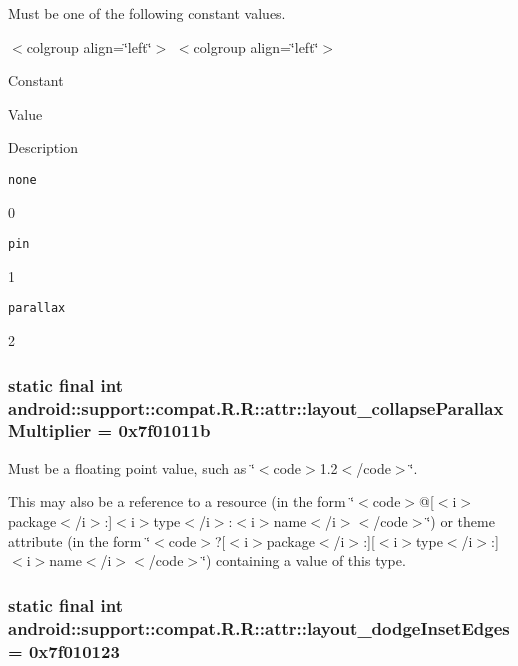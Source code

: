 Must be one of the following constant values. \begin{TabularC}{0}
\hline
\end{TabularC}
$<$colgroup align=\char`\"{}left\char`\"{}$>$ $<$colgroup align=\char`\"{}left\char`\"{}$>$ 

Constant

Value

Description 

{\tt none}

0

{\tt pin}

1

{\tt parallax}

2\hypertarget{classandroid_1_1support_1_1compat_1_1_r_1_1attr_7ff064e7096b2c769aab56b5e3b2815d}{
\subsubsection[{layout\_\-collapseParallaxMultiplier}]{\setlength{\rightskip}{0pt plus 5cm}static final int android::support::compat.R.R::attr::layout\_\-collapseParallaxMultiplier = 0x7f01011b}}
\label{classandroid_1_1support_1_1compat_1_1_r_1_1attr_7ff064e7096b2c769aab56b5e3b2815d}


Must be a floating point value, such as \char`\"{}$<$code$>$1.2$<$/code$>$\char`\"{}. 

This may also be a reference to a resource (in the form \char`\"{}$<$code$>$@\mbox{[}$<$i$>$package$<$/i$>$:\mbox{]}$<$i$>$type$<$/i$>$:$<$i$>$name$<$/i$>$$<$/code$>$\char`\"{}) or theme attribute (in the form \char`\"{}$<$code$>$?\mbox{[}$<$i$>$package$<$/i$>$:\mbox{]}\mbox{[}$<$i$>$type$<$/i$>$:\mbox{]}$<$i$>$name$<$/i$>$$<$/code$>$\char`\"{}) containing a value of this type. \hypertarget{classandroid_1_1support_1_1compat_1_1_r_1_1attr_daaf7e7b02e6dbddb8151e2f988f8b2a}{
\subsubsection[{layout\_\-dodgeInsetEdges}]{\setlength{\rightskip}{0pt plus 5cm}static final int android::support::compat.R.R::attr::layout\_\-dodgeInsetEdges = 0x7f010123}}
\label{classandroid_1_1support_1_1compat_1_1_r_1_1attr_daaf7e7b02e6dbddb8151e2f988f8b2a}


